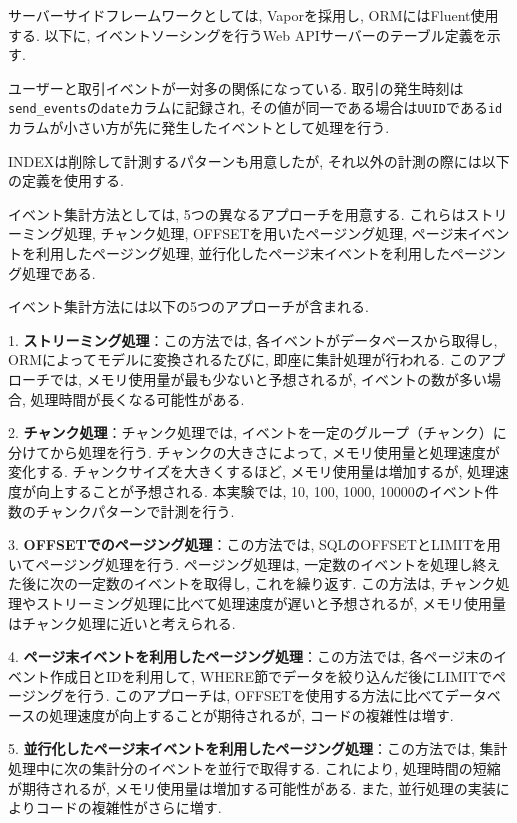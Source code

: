 \documentclass[../../../main]{subfiles}
\begin{document}
    サーバーサイドフレームワークとしては, Vaporを採用し, ORMにはFluent使用する. 以下に, イベントソーシングを行うWeb APIサーバーのテーブル定義を示す.

    

    ユーザーと取引イベントが一対多の関係になっている. 取引の発生時刻は\texttt{send\_events}の\texttt{date}カラムに記録され, その値が同一である場合は\texttt{UUID}である\texttt{id}カラムが小さい方が先に発生したイベントとして処理を行う.

    INDEXは削除して計測するパターンも用意したが, それ以外の計測の際には以下の定義を使用する.

    

    イベント集計方法としては, 5つの異なるアプローチを用意する. これらはストリーミング処理, チャンク処理, OFFSETを用いたページング処理, ページ末イベントを利用したページング処理, 並行化したページ末イベントを利用したページング処理である.

    イベント集計方法には以下の5つのアプローチが含まれる.

    1. \textbf{ストリーミング処理}：この方法では, 各イベントがデータベースから取得し, ORMによってモデルに変換されるたびに, 即座に集計処理が行われる. このアプローチでは, メモリ使用量が最も少ないと予想されるが, イベントの数が多い場合, 処理時間が長くなる可能性がある.

    2. \textbf{チャンク処理}：チャンク処理では, イベントを一定のグループ（チャンク）に分けてから処理を行う. チャンクの大きさによって, メモリ使用量と処理速度が変化する. チャンクサイズを大きくするほど, メモリ使用量は増加するが, 処理速度が向上することが予想される. 本実験では, 10, 100, 1000, 10000のイベント件数のチャンクパターンで計測を行う.

    3. \textbf{OFFSETでのページング処理}：この方法では, SQLのOFFSETとLIMITを用いてページング処理を行う. ページング処理は, 一定数のイベントを処理し終えた後に次の一定数のイベントを取得し, これを繰り返す. この方法は, チャンク処理やストリーミング処理に比べて処理速度が遅いと予想されるが, メモリ使用量はチャンク処理に近いと考えられる.

    4. \textbf{ページ末イベントを利用したページング処理}：この方法では, 各ページ末のイベント作成日とIDを利用して, WHERE節でデータを絞り込んだ後にLIMITでページングを行う. このアプローチは, OFFSETを使用する方法に比べてデータベースの処理速度が向上することが期待されるが, コードの複雑性は増す.

    5. \textbf{並行化したページ末イベントを利用したページング処理}：この方法では, 集計処理中に次の集計分のイベントを並行で取得する. これにより, 処理時間の短縮が期待されるが, メモリ使用量は増加する可能性がある. また, 並行処理の実装によりコードの複雑性がさらに増す.
\end{document}
